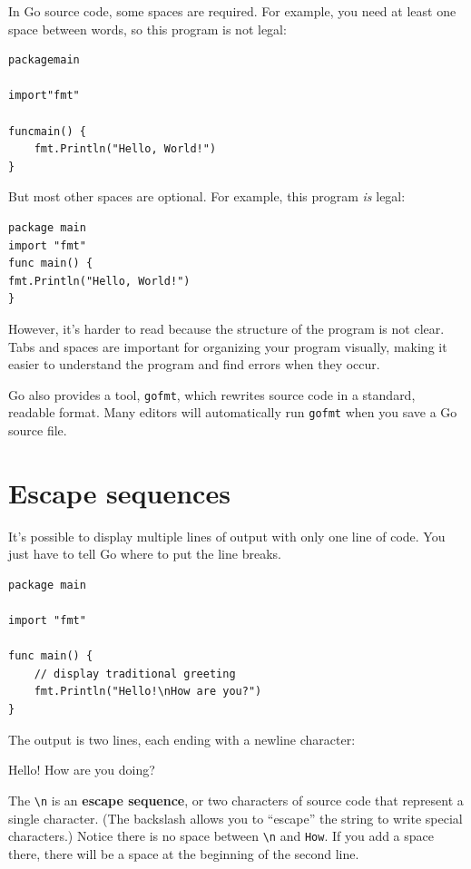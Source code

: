 In Go source code, some spaces are required.
For example, you need at least one space between words, so this program is not legal:

\begin{verbatim}
packagemain

import"fmt"

funcmain() {
	fmt.Println("Hello, World!") 
}
\end{verbatim}


But most other spaces are optional.
For example, this program {\em is} legal:

\begin{lstlisting}
package main
import "fmt"
func main() {
fmt.Println("Hello, World!") 
}
\end{lstlisting}

However, it's harder to read because the structure of the program is not clear.
Tabs and spaces are important for organizing your program visually, making it easier to understand the program and find errors when they occur.

Go also provides a tool, {\tt gofmt}, which rewrites source code in a standard, readable format. Many editors will automatically run {\tt gofmt} when you save a Go source file. 


\section{Escape sequences}

It's possible to display multiple lines of output with only one line of code.
You just have to tell Go where to put the line breaks.

\begin{lstlisting}
package main

import "fmt"

func main() {
	// display traditional greeting
	fmt.Println("Hello!\nHow are you?")
}
\end{lstlisting}

The output is two lines, each ending with a newline character:

\begin{stdout}
Hello!
How are you doing?
\end{stdout}


The \verb"\n" is an {\bf escape sequence}, or two characters of source code that represent a single character.
(The backslash allows you to ``escape'' the string to write special characters.)
Notice there is no space between \verb"\n" and \verb"How".
If you add a space there, there will be a space at the beginning of the second line.

